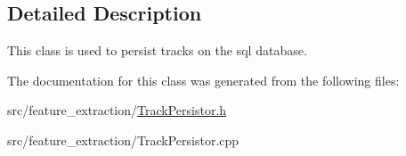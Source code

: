 \subsection{Detailed Description}
This class is used to persist tracks on the sql database. 

The documentation for this class was generated from the following files\+:\begin{DoxyCompactItemize}
\item 
src/feature\+\_\+extraction/\mbox{\hyperlink{_track_persistor_8h}{Track\+Persistor.\+h}}\item 
src/feature\+\_\+extraction/Track\+Persistor.\+cpp\end{DoxyCompactItemize}
